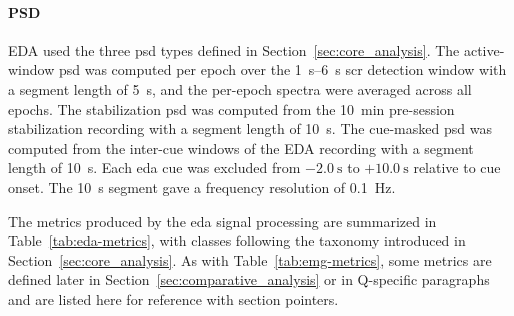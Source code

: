 \paragraph{PSD}
EDA used the three \gls{psd} types defined in Section~\ref{sec:core_analysis}. The active-window \gls{psd} was computed per epoch over the \SIrange{1}{6}{\second} \gls{scr} detection window with a segment length of \SI{5}{\second}, and the per-epoch spectra were averaged across all epochs. The stabilization \gls{psd} was computed from the \SI{10}{\minute} pre-session stabilization recording with a segment length of \SI{10}{\second}. The cue-masked \gls{psd} was computed from the inter-cue windows of the EDA recording with a segment length of \SI{10}{\second}. Each \gls{eda} cue was excluded from $-\SI{2.0}{\second}$ to $+\SI{10.0}{\second}$ relative to cue onset. The \SI{10}{\second} segment gave a frequency resolution of \SI{0.1}{\hertz}.

The metrics produced by the \gls{eda} signal processing are summarized in Table~\ref{tab:eda-metrics}, with classes following the taxonomy introduced in Section~\ref{sec:core_analysis}. As with Table~\ref{tab:emg-metrics}, some metrics are defined later in Section~\ref{sec:comparative_analysis} or in Q-specific paragraphs and are listed here for reference with section pointers.

